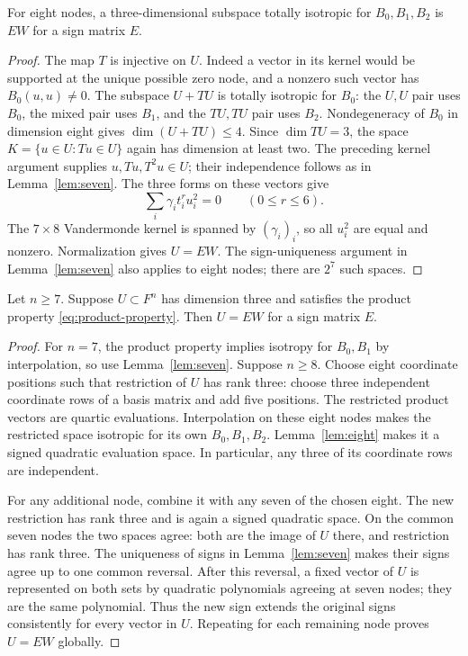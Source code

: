 \begin{lemma}\label{lem:eight}
For eight nodes, a three-dimensional subspace totally isotropic
for $B_0,B_1,B_2$ is $EW$ for a sign matrix $E$.
\end{lemma}
\begin{proof}
The map $T$ is injective on $U$. Indeed a vector in its kernel
would be supported at the unique possible zero node, and a
nonzero such vector has $B_0(u,u)\ne0$.
The subspace $U+TU$ is totally isotropic for $B_0$: the
$U,U$ pair uses $B_0$, the mixed pair uses $B_1$, and the
$TU,TU$ pair uses $B_2$. Nondegeneracy of $B_0$ in dimension
eight gives $\dim(U+TU)\le4$. Since $\dim TU=3$, the space
$K=\{u\in U:Tu\in U\}$ again has dimension at least two.
The preceding kernel argument supplies $u,Tu,T^2u\in U$;
their independence follows as in Lemma~\ref{lem:seven}.
The three forms on these vectors give
\[
 \sum_i\gamma_i t_i^r u_i^2=0\qquad(0\le r\le6).
\]
The $7\times8$ Vandermonde kernel is spanned by $(\gamma_i)_i$,
so all $u_i^2$ are equal and nonzero. Normalization gives $U=EW$.
The sign-uniqueness argument in Lemma~\ref{lem:seven} also
applies to eight nodes; there are $2^7$ such spaces.
\end{proof}

\begin{proposition}\label{prop:gluing}
Let $n\ge7$. Suppose $U\subset F^n$ has dimension three and
satisfies the product property \eqref{eq:product-property}.
Then $U=EW$ for a sign matrix $E$.
\end{proposition}
\begin{proof}
For $n=7$, the product property implies isotropy for $B_0,B_1$
by interpolation, so use Lemma~\ref{lem:seven}. Suppose $n\ge8$.
Choose eight coordinate positions such that restriction of $U$
has rank three: choose three independent coordinate rows of a
basis matrix and add five positions. The restricted product vectors
are quartic evaluations. Interpolation on these eight nodes makes
the restricted space isotropic for its own $B_0,B_1,B_2$.
Lemma~\ref{lem:eight} makes it a signed quadratic evaluation
space. In particular, any three of its coordinate rows are
independent.

For any additional node, combine it with any seven of the chosen
eight. The new restriction has rank three and is again a signed
quadratic space. On the common seven nodes the two spaces agree:
both are the image of $U$ there, and restriction has rank three.
The uniqueness of signs in Lemma~\ref{lem:seven} makes their
signs agree up to one common reversal. After this reversal, a
fixed vector of $U$ is represented on both sets by quadratic
polynomials agreeing at seven nodes; they are the same polynomial.
Thus the new sign extends the original signs consistently for
every vector in $U$. Repeating for each remaining node proves
$U=EW$ globally.
\end{proof}

